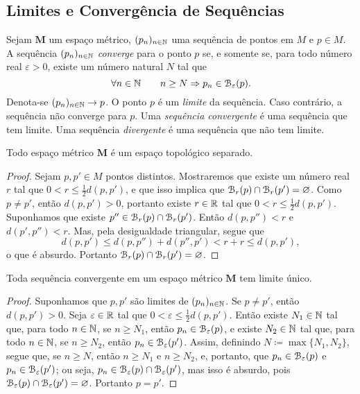 \subsection{Limites e Convergência de Sequências}

\begin{defi}
Sejam $\bm M$ um espaço métrico, $(p_n)_{n \in \mathbb{N}}$ uma sequência de pontos em $M$ e $p \in M$. A sequência $(p_n)_{n \in \mathbb{N}}$  \emph{converge} para o ponto $p$ se, e somente se, para todo número real $\varepsilon > 0$, existe um número natural $N$ tal que
	\begin{equation*}
	\forall n \in \mathbb{N} \qquad n \geq N \Rightarrow p_n \in \mathcal{B}_\varepsilon(p).
	\end{equation*}
Denota-se $(p_n)_{n \in \mathbb{N}} \rightarrow p$. O ponto $p$ é um \emph{limite} da sequência.  Caso contrário, a sequência não converge para $p$. Uma \emph{sequência convergente} é uma sequência que tem limite. Uma sequência \emph{divergente} é uma sequência que não tem limite.
\end{defi}

\begin{prop}
Todo espaço métrico $\bm M$ é um espaço topológico separado.
\end{prop}
\begin{proof}
Sejam $p,p' \in M$ pontos distintos. Mostraremos que existe um número real $r$ tal que $0 < r \leq \frac{1}{2} d(p,p')$, e que isso implica que $\mathcal{B}_r(p) \cap \mathcal{B}_r(p') = \varnothing$. Como $p \neq p'$, então $d(p,p') > 0$, portanto existe $r \in \mathbb{R}$ tal que $0 < r \leq \frac{1}{2} d(p,p')$. Suponhamos que existe $p'' \in \mathcal{B}_r(p) \cap \mathcal{B}_r(p')$. Então $d(p,p'')<r$ e $d(p',p'')<r$. Mas, pela desigualdade triangular, segue que
	\begin{equation*}
	d(p,p') \leq d(p,p'') + d(p'',p') < r + r \leq d(p,p'),
	\end{equation*}
o que é absurdo. Portanto $\mathcal{B}_r(p) \cap \mathcal{B}_r(p') = \varnothing$.
\end{proof}

\begin{coro}
Toda sequência convergente em um espaço métrico $\bm M$ tem limite único.
\end{coro}
\begin{proof}
Suponhamos que $p,p'$ são limites de $(p_n)_{n \in \mathbb{N}}$. Se $p \neq p'$, então $d(p,p')>0$. Seja $\varepsilon \in \mathbb{R}$ tal que $0 < \varepsilon \leq \frac{1}{2} d(p,p')$. Então existe $N_1 \in \mathbb{N}$ tal que, para todo $n \in \mathbb{N}$, se $n \geq N_1$, então $p_n \in \mathcal{B}_\varepsilon(p)$, e existe $N_2 \in \mathbb{N}$ tal que, para todo $n \in \mathbb{N}$, se $n \geq N_2$, então $p_n \in \mathcal{B}_\varepsilon(p')$. Assim, definindo $N \coloneqq \max \{N_1,N_2\}$, segue que, se $n \geq N$, então $n \geq N_1$ e $n \geq N_2$, e, portanto, que $p_n \in \mathcal{B}_\varepsilon(p)$ e $p_n \in \mathcal{B}_\varepsilon(p')$; ou seja, $p_n \in \mathcal{B}_\varepsilon(p) \cap \mathcal{B}_\varepsilon(p')$, mas isso é absurdo, pois $\mathcal{B}_\varepsilon(p) \cap \mathcal{B}_\varepsilon(p')=\varnothing$. Portanto $p=p'$.
\end{proof}

